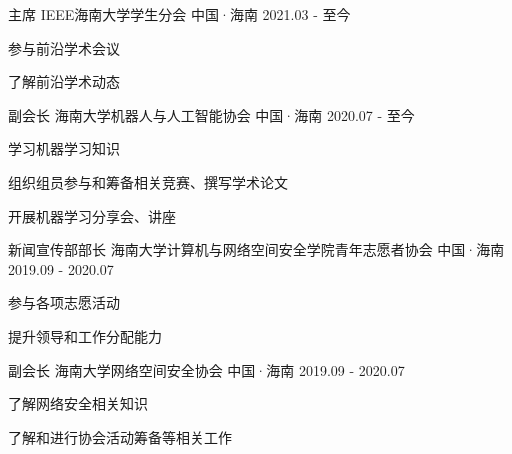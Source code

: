 

\begin{cventries}
	\cventry
	{主席} %
	{IEEE海南大学学生分会} %
	{中国·海南} %
	{2021.03 - 至今} %
	{
		\begin{cvitems} %
			\item{参与前沿学术会议}
			\item{了解前沿学术动态}
		\end{cvitems}
	}


	\cventry
	{副会长} %
	{海南大学机器人与人工智能协会} %
	{中国·海南} %
	{2020.07 - 至今} %
	{
		\begin{cvitems} %
			\item{学习机器学习知识}
			\item{组织组员参与和筹备相关竞赛、撰写学术论文}
			\item{开展机器学习分享会、讲座}
		\end{cvitems}
	}

  \cventry
    {新闻宣传部部长} %
    {海南大学计算机与网络空间安全学院青年志愿者协会} %
    {中国·海南} %
    {2019.09 - 2020.07} %
    {
      \begin{cvitems} %
        \item {参与各项志愿活动}
        \item {提升领导和工作分配能力}
      \end{cvitems}
    }

  \cventry
    {副会长} %
    {海南大学网络空间安全协会} %
    {中国·海南} %
    {2019.09 - 2020.07} %
    {
      \begin{cvitems} %
      	\item {了解网络安全相关知识}
      	\item {了解和进行协会活动筹备等相关工作}
      \end{cvitems}
    }
\end{cventries}

